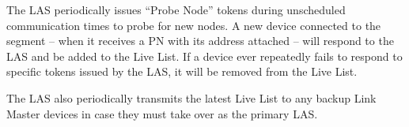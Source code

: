 
The LAS periodically issues ``Probe Node'' tokens during unscheduled communication times to probe for new nodes.  A new device connected to the segment -- when it receives a PN with its address attached -- will respond to the LAS and be added to the Live List.  If a device ever repeatedly fails to respond to specific tokens issued by the LAS, it will be removed from the Live List.

The LAS also periodically transmits the latest Live List to any backup Link Master devices in case they must take over as the primary LAS.




